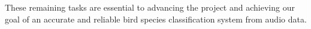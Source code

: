 These remaining tasks are essential to advancing the project and achieving our goal of an accurate and reliable bird species classification system from audio data. 

\newpage

\renewcommand\bibname{REFERENCES} %





